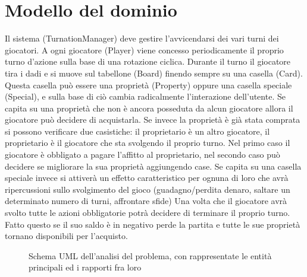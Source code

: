 \section{Modello del dominio}
Il sistema (TurnationManager) deve gestire l’avvicendarsi dei vari turni dei giocatori. 
A ogni giocatore (Player) viene concesso periodicamente il proprio turno d’azione sulla base di una rotazione ciclica. 
Durante il turno il giocatore tira i dadi e si muove sul tabellone (Board) finendo sempre su una casella (Card).
Questa casella può essere una proprietà (Property) oppure una casella speciale (Special), 
e sulla base di ciò cambia radicalmente l’interazione dell’utente. 
Se capita su una proprietà che non è ancora posseduta da alcun giocatore allora 
il giocatore può decidere di acquistarla. 
Se invece la proprietà è già stata comprata si possono verificare due casistiche: il proprietario è un 
altro giocatore, il proprietario è il giocatore che sta svolgendo il proprio turno. 
Nel primo caso il giocatore è obbligato a pagare l’affitto al proprietario, 
nel secondo caso può decidere se migliorare la sua proprietà aggiungendo case.
Se capita su una casella speciale invece si attiverà un effetto caratteristico 
per ognuna di loro che avrà ripercussioni sullo svolgimento del gioco 
(guadagno/perdita denaro, saltare un determinato numero di turni, affrontare sfide)
Una volta che il giocatore avrà svolto tutte le azioni obbligatorie potrà decidere di terminare il proprio turno. 
Fatto questo se il suo saldo è in negativo perde la partita e tutte le sue proprietà tornano disponibili per l’acquisto. 




\begin{figure}[H]
    \centering
    \caption{Schema UML dell'analisi del problema, con rappresentate le entità principali ed i rapporti fra loro}
	\label{img:entity_diagram}
\end{figure}
